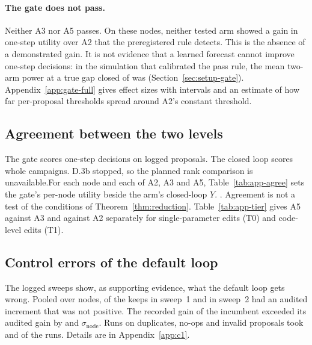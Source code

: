 \paragraph{The gate does not pass.}
Neither A3 nor A5 passes.  On these nodes, neither tested arm showed a gain in one-step utility over A2 that the preregistered rule detects. This is the absence of a demonstrated gain. It is not evidence that a learned forecast cannot improve one-step decisions: in the simulation that calibrated the pass rule, the mean two-arm power at a true gap closed of \GatePowerEffect{} was \GatePowerMain{} (Section~\ref{sec:setup-gate}). Appendix~\ref{app:gate-full} gives effect sizes with intervals and an estimate of how far per-proposal thresholds spread around A2's constant threshold.
\fi

\subsection{Agreement between the two levels}
\label{sec:results-agree}

The gate scores one-step decisions on logged proposals. The closed loop scores whole campaigns. \ifLearnedNotRun D.3b stopped, so the planned rank comparison is unavailable.\else For each node and each of A2, A3 and A5, Table~\ref{tab:app-agree} sets the gate's per-node utility beside the arm's closed-loop $Y$. \LoopRankAgreement. %
 Agreement is not a test of the conditions of Theorem~\ref{thm:reduction}.\fi{} Table~\ref{tab:app-tier} gives A5 against A3 and against A2 separately for single-parameter edits (T0) and code-level edits (T1).

\fi

\subsection{Control errors of the default loop}
\label{sec:results-c1}

The logged sweeps show, as supporting evidence, what the default loop gets wrong. Pooled over nodes, \COneFalseKeepSOne{} of the keeps in sweep~1 and \COneFalseKeepSTwo{} in sweep~2 had an audited increment that was not positive. The recorded gain of the incumbent exceeded its audited gain by \COneRecordBiasSOne{} and \COneRecordBiasSTwo{} $\sigma_{\mathrm{node}}$. Runs on duplicates, no-ops and invalid proposals took \COneWastedSOne{} and \COneWastedSTwo{} of the runs. Details are in Appendix~\ref{app:c1}.
